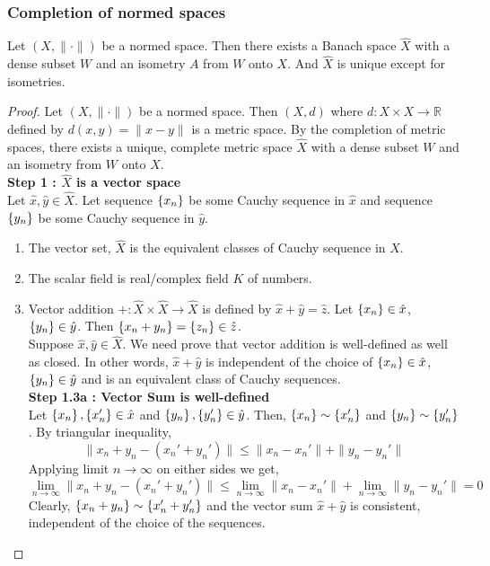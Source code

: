 \subsubsection{Completion of normed spaces}
\begin{theorem}[completion]
	Let $(X,\|\cdot\|)$ be a normed space.
	Then there exists a Banach space $\hat{X}$ with a dense subset $W$ and an isometry $A$ from $W$ onto $X$.
	And $\hat{X}$ is unique except for isometries.
\end{theorem}
\begin{proof}
	Let $(X,\|\cdot\|)$ be a normed space.
	Then $(X,d)$ where $d : X \times X \to \mathbb{R}$ defined by $d(x,y) = \| x-y \|$ is a metric space.
	By the completion of metric spaces, there exists a unique, complete metric space $\hat{X}$ with a dense subset $W$ and an isometry from $W$ onto $X$.\\

	\textbf{Step 1 : $\hat{X}$ is a vector space}\\
	Let $\hat{x},\hat{y} \in \hat{X}$.
	Let sequence $\left\{x_n\right\}$ be some Cauchy sequence in $\hat{x}$ and sequence $\left\{y_n\right\}$ be some Cauchy sequence in $\hat{y}$.
	\begin{enumerate}
		\item The vector set, $\hat{X}$ is the equivalent classes of Cauchy sequence in $X$.
		\item The scalar field is real/complex field $K$ of numbers.
		\item Vector addition $+ : \hat{X} \times \hat{X} \to \hat{X}$ is defined by $\hat{x} + \hat{y} = \hat{z}$.
			Let $\left\{x_n\right\} \in \hat{x}$, $\left\{y_n\right\} \in \hat{y}$.
			Then $\left\{x_n+y_n\right\} = \left\{z_n\right\} \in \hat{z}$.\\

			Suppose $\hat{x},\hat{y} \in \hat{X}$.
			We need prove that vector addition is well-defined as well as closed.
			In other words, $\hat{x}+\hat{y}$ is independent of the choice of $\left\{x_n\right\} \in \hat{x}$, $\left\{y_n\right\} \in \hat{y}$ and is an equivalent class of Cauchy sequences.\\

			\textbf{Step 1.3a : Vector Sum is well-defined}\\
			Let $\left\{x_n\right\},\left\{x_n'\right\} \in \hat{x}$ and $\left\{y_n\right\},\left\{y_n'\right\} \in \hat{y}$.
			Then, $\left\{x_n\right\} \sim \left\{x_n'\right\}$ and $\left\{y_n\right\} \sim \left\{y_n'\right\}$.
			By triangular inequality,
			\[ \| x_n + y_n - (x_n' + y_n') \| \le \| x_n - x_n'\| + \| y_n - y_n' \| \]
			Applying limit $n \to \infty $ on either sides we get,
			\[ \lim_{n \to \infty} \| x_n + y_n - (x_n'+y_n') \| \le \lim_{n \to \infty} \| x_n - x_n' \| + \lim_{n \to \infty} \| y_n - y_n' \| = 0 \]
			Clearly, $\left\{x_n+y_n\right\} \sim \left\{x_n'+y_n'\right\}$ and the vector sum $\hat{x}+\hat{y}$ is consistent, independent of the choice of the sequences.\\


\end{enumerate}
\end{proof}
